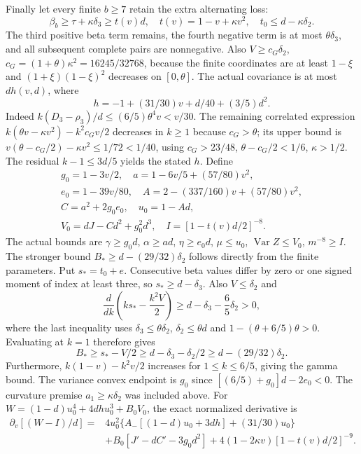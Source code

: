 Finally let every finite $b\ge7$ retain the extra alternating loss:
\begin{equation}\tag{L58.15.1}\label{eq:L58:tailbeta}
\beta_b\ge\tau+\kappa\delta_3\ge t(v)d,
\quad t(v)=1-v+\kappa v^2,\quad
t_0\le d-\kappa\delta_2.
\end{equation}
The third positive beta term remains, the fourth negative term is at
most $\theta\delta_3$, and all subsequent complete pairs are
nonnegative. Also
$V\ge c_G\delta_2$,
$c_G=(1+\theta)\kappa^2=16245/32768$,
because the finite coordinates are at least $1-\xi$ and
$(1+\xi)(1-\xi)^2$ decreases on $[0,\theta]$.
The actual covariance is at most $dh(v,d)$, where
\[
h=-1+(31/30)v+d/40+(3/5)d^2.
\]
Indeed $k(D_3-\rho_3)/d\le(6/5)\theta^4v<v/30$.
The remaining correlated expression
$k(\theta v-\kappa v^2)-k^2c_Gv/2$ decreases in $k\ge1$ because
$c_G>\theta$; its upper bound is
$v(\theta-c_G/2)-\kappa v^2\le1/72<1/40$,
using $c_G>23/48$, $\theta-c_G/2<1/6$, $\kappa>1/2$.
The residual $k-1\le3d/5$ yields the stated $h$.
Define
\begin{equation}\tag{L58.15.4}\label{eq:L58:tailparameters}
\begin{gathered}
g_0=1-3v/2,\quad a=1-6v/5+(57/80)v^2,\\
e_0=1-39v/80,\quad A=2-(337/160)v+(57/80)v^2,\\
C=a^2+2g_0e_0,\quad u_0=1-Ad,\\
V_0=dJ-Cd^2+g_0^2d^3,\quad I=[1-t(v)d/2]^{-8}.
\end{gathered}
\end{equation}
The actual bounds are $\gamma\ge g_0d$, $\alpha\ge ad$,
$\eta\ge e_0d$, $\mu\le u_0$, $\operatorname{Var}Z\le V_0$,
$m^{-8}\ge I$.
The stronger bound $B_*\ge d-(29/32)\delta_2$ follows directly
from the finite parameters. Put $s_*=t_0+e$. Consecutive beta values
differ by zero or one signed moment of index at least three, so
$s_*\ge d-\delta_3$. Also $V\le\delta_2$ and
\[
 \frac{d}{dk}\left(ks_*-\frac{k^2V}{2}\right)
 \ge d-\delta_3-\frac65\delta_2>0,
\]
where the last inequality uses $\delta_3\le\theta\delta_2$,
$\delta_2\le\theta d$ and $1-(\theta+6/5)\theta>0$.
Evaluating at $k=1$ therefore gives
\[
 B_*\ge s_*-V/2\ge d-\delta_3-\delta_2/2
       \ge d-(29/32)\delta_2.
\]
Furthermore, $k(1-v)-k^2v/2$ increases for $1\le k\le6/5$, giving
the gamma bound. The variance convex endpoint is $g_0$ since
$[(6/5)+g_0]d-2e_0<0$.
The curvature premise $a_1\ge\kappa\delta_2$ was included above.
For $W=(1-d)u_0^4+4dhu_0^3+B_0V_0$, the exact normalized derivative is
\begin{equation}\tag{L58.15.6}\label{eq:L58:tailderivative}
\begin{aligned}
\partial_v[(W-I)/d]
={}&4u_0^2\{A_-[(1-d)u_0+3dh]+(31/30)u_0\}\\
&+B_0[J'-dC'-3g_0d^2]
+4(1-2\kappa v)[1-t(v)d/2]^{-9}.
\end{aligned}
\end{equation}
